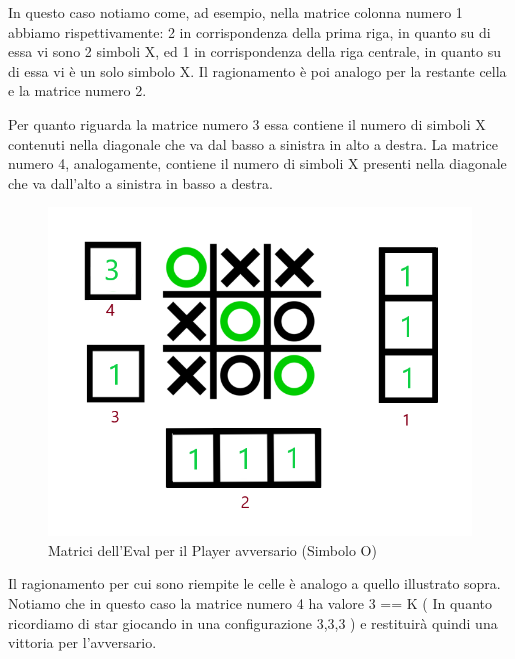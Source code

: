 \documentclass{article}
\begin{document}
In questo caso notiamo come, ad esempio, nella matrice colonna numero 1 abbiamo rispettivamente: 2 in corrispondenza della prima riga, in quanto su di essa vi sono 2 simboli X, ed 1 in corrispondenza della riga centrale, in quanto su di essa vi è un solo simbolo X. Il ragionamento è poi analogo per la restante cella e la matrice numero 2.

Per quanto riguarda la matrice numero 3 essa contiene il numero di simboli X contenuti nella diagonale che va dal basso a sinistra in alto a destra.
La matrice numero 4, analogamente, contiene il numero di simboli X presenti nella diagonale che va dall'alto a sinistra in basso a destra.

\newpage

\begin{figure}[!h]
\centering
\includegraphics[width=0.5\columnwidth]{MatriciEvalAvversario.png}
\caption{Matrici dell'Eval per il Player avversario (Simbolo O)}
\end{figure}

Il ragionamento per cui sono riempite le celle è analogo a quello illustrato sopra.
Notiamo che in questo caso la matrice numero 4 ha valore 3 == K ( In quanto ricordiamo di star giocando in una configurazione 3,3,3 ) e restituirà quindi una vittoria per l'avversario.

\medskip
\end{document}

